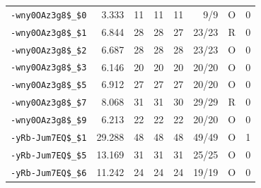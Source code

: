 {\begin{longtable}{lrrrrrcc}
\texttt{-wny0OAz3g8\$\_\$0} & 3.333 & 11 & 11 & 11 & 9/9 & O & 0 \\
\texttt{-wny0OAz3g8\$\_\$1} & 6.844 & 28 & 28 & 27 & 23/23 & R & 0 \\
\texttt{-wny0OAz3g8\$\_\$2} & 6.687 & 28 & 28 & 28 & 23/23 & O & 0 \\
\texttt{-wny0OAz3g8\$\_\$3} & 6.146 & 20 & 20 & 20 & 20/20 & O & 0 \\
\texttt{-wny0OAz3g8\$\_\$5} & 6.912 & 27 & 27 & 27 & 20/20 & O & 0 \\
\texttt{-wny0OAz3g8\$\_\$7} & 8.068 & 31 & 31 & 30 & 29/29 & R & 0 \\
\texttt{-wny0OAz3g8\$\_\$9} & 6.213 & 22 & 22 & 22 & 20/20 & O & 0 \\
\texttt{-yRb-Jum7EQ\$\_\$1} & 29.288 & 48 & 48 & 48 & 49/49 & O & 1 \\
\texttt{-yRb-Jum7EQ\$\_\$5} & 13.169 & 31 & 31 & 31 & 25/25 & O & 0 \\
\texttt{-yRb-Jum7EQ\$\_\$6} & 11.242 & 24 & 24 & 24 & 19/19 & O & 0 \\
\end{longtable}}
